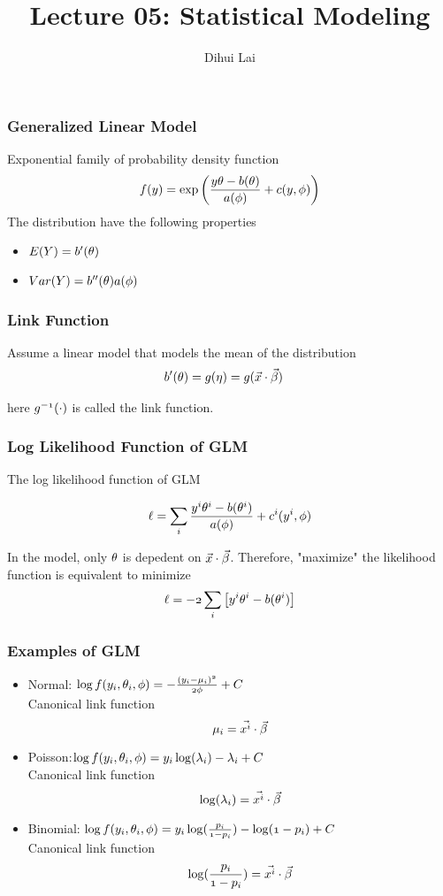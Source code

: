 \documentclass[notheorems, aspectratio=54, tikz,border=10pt,multi]{beamer}
\title{Lecture 05: Statistical Modeling}
\author{Dihui Lai}
\institute[WUSTL]{dlai@wustl.edu}
\begin{document}
\begin{frame}
    \titlepage
\end{frame}

\begin{frame}
\frametitle{Generalized Linear Model}
Exponential family of probability density function
$$
\mathnormal{f(y)}=\exp\mathnormal{\left( \frac{y\theta-b(\theta)}{a(\phi)}+c(y, \phi)\right)}
$$
The distribution have the following properties
\begin{itemize}
\item $\mathnormal{E(Y)}=\mathnormal{b'(\theta)}$
\item $\mathnormal{Var(Y)}=\mathnormal{b''(\theta)a(\phi)}$
\end{itemize}
\end{frame}

\begin{frame}
\frametitle{Link Function}
Assume a linear model that models the mean of the distribution 
\begin{align*}
\mathnormal{b'(\theta)}&=\mathnormal{g(\eta)}=\mathnormal{g(\vec{x}\cdot\vec{\beta})}
\end{align*}

here $\mathnormal{g^{-1}(\cdot)}$ is called the link function.

\end{frame}

\begin{frame}
\frametitle{Log Likelihood Function of GLM}
The log likelihood function of GLM

$$\mathnormal{\ell}=\mathnormal{\sum_{i}\frac{y^i\theta^i-b(\theta^i)}{a(\phi)}+c^i(y^i, \phi)}$$

In the model, only $\mathnormal{\theta}$ is depedent on $\mathnormal{\vec{x}\cdot\vec{\beta}}$. Therefore, "maximize" the likelihood function is equivalent to minimize  
$$\mathnormal{\ell=-2\sum_{i} \left[y^i\theta^i-b(\theta^i)\right]}$$

\end{frame}


\begin{frame}
\frametitle{Examples of GLM}

\begin{itemize}
\item Normal: $\mathnormal{\log f(y_i, \theta_i, \phi)=-\frac{(y_i-\mu_i)^2}{2\phi}+C}$\\
Canonical link function $$\mathnormal{\mu_i=\vec{x^i}\cdot\vec{\beta}}$$

\item Poisson:$\mathnormal{\log f(y_i, \theta_i, \phi)=y_i \log(\lambda_i)-\lambda_i+C}$\\
Canonical link function $$\mathnormal{\log(\lambda_i)=\vec{x^i}\cdot\vec{\beta}}$$
 
\item Binomial: $\mathnormal{\log f(y_i, \theta_i, \phi)=y_i \log(\frac{p_i}{1-p_i})-\log(1-p_i)+C}$\\
Canonical link function $$\mathnormal{\log(\frac{p_i}{1-p_i})=\vec{x^i}\cdot\vec{\beta}}$$

\end{itemize}

\end{frame}
\end{document}
